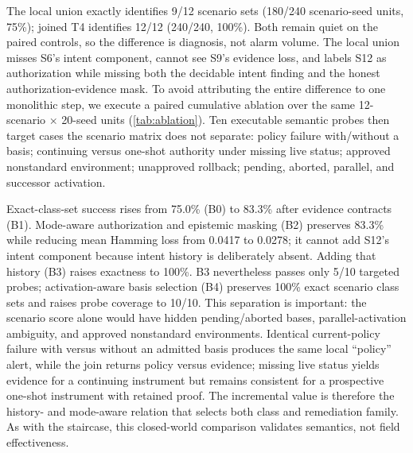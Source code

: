 The local union exactly identifies 9/12 scenario sets (180/240
scenario-seed units, 75\%); joined T4 identifies 12/12 (240/240, 100\%).
Both remain quiet on the paired controls, so the difference is diagnosis,
not alarm volume. The local union misses S6's intent component, cannot see
S9's evidence loss, and labels S12 as authorization while missing both the
decidable intent finding and the honest authorization-evidence mask. To avoid attributing the entire difference to one
monolithic step, we execute a paired cumulative ablation over the same
12-scenario $\times$ 20-seed units (\cref{tab:ablation}). Ten executable
semantic probes then target cases the scenario matrix does not separate:
policy failure with/without a basis; continuing versus one-shot authority
under missing live status; approved nonstandard environment; unapproved
rollback; pending, aborted, parallel, and successor activation.

\begin{table}[t]
\centering
\caption{Cumulative Ablation of the Admitted-Basis Join. Exact Is
Unconditional Exact-Class-Set Success Over Paired Scenario--Seed Units; Probes
Are Executable Semantic Contracts.}
\label{tab:ablation}
\scriptsize
\resizebox{\columnwidth}{!}{}
\end{table}

Exact-class-set success rises from 75.0\% (B0) to 83.3\% after evidence
contracts (B1). Mode-aware authorization and epistemic masking (B2) preserves
83.3\% while reducing mean Hamming loss from 0.0417 to 0.0278; it cannot add
S12's intent component because intent history is deliberately absent. Adding
that history (B3) raises exactness to 100\%. B3 nevertheless passes only 5/10
targeted probes; activation-aware basis selection (B4) preserves 100\% exact
scenario class sets and raises probe coverage to 10/10. This separation is
important: the scenario score alone would have hidden pending/aborted bases,
parallel-activation ambiguity, and approved nonstandard environments.
Identical
current-policy failure with versus without an admitted basis produces the
same local ``policy'' alert, while the join returns policy versus evidence;
missing live status yields evidence for a continuing instrument but remains
consistent for a prospective one-shot instrument with retained proof. The
incremental value is therefore the history- and mode-aware relation that
selects both class and remediation family. As with the staircase, this
closed-world comparison validates semantics, not field effectiveness.

